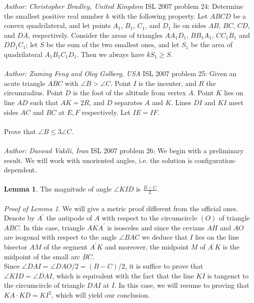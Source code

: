 \textit{Author: Christopher Bradley, United Kingdom } 
ISL 2007 problem 24:  Determine the smallest positive real number $ k$ with the following property. Let $ ABCD$ be a convex quadrilateral, and let points $ A_1$, $ B_1$, $ C_1$, and $ D_1$ lie on sides $ AB$, $ BC$, $ CD$, and $ DA$, respectively. Consider the areas of triangles $ AA_1D_1$, $ BB_1A_1$, $ CC_1B_1$ and $ DD_1C_1$; let $ S$ be the sum of the two smallest ones, and let $ S_1$ be the area of quadrilateral $ A_1B_1C_1D_1$. Then we always have $ kS_1\ge S$. \\\\
\textit{Author: Zuming Feng and Oleg Golberg, USA} 
ISL 2007 problem 25:  Given an acute triangle $ ABC$ with $ \angle B > \angle C$. Point $ I$ is the incenter, and $ R$ the circumradius. Point $ D$ is the foot of the altitude from vertex $ A$. Point $ K$ lies on line $ AD$ such that $ AK = 2R$, and $ D$ separates $ A$ and $ K$. Lines $ DI$ and $ KI$ meet sides $ AC$ and $ BC$ at $ E,F$ respectively. Let $ IE = IF$. \\\\
Prove that $ \angle B\leq 3\angle C$. \\\\
\textit{Author: Davoud Vakili, Iran} 
ISL 2007 problem 26:  We begin with a preliminary result. We will work with unoriented angles, i.e. the solution is configuration-dependent. \\\\
\textbf{Lemma 1}. The magnitude of angle $ \angle{KID}$ is $ \frac {B - C}{2}$. \\\\
\textit{Proof of Lemma 1}. We will give a metric proof different from the official ones. \\
Denote by $ A^{\prime}$ the antipode of $ A$ with respect to the circumcircle $ (O)$ of triangle $ ABC$. In this case, triangle $ AKA^{\prime}$ is isosceles and since the cevians $ AH$ and $ AO$ are isogonal with respect to the angle $ \angle{BAC}$ we deduce that $ I$ lies on the line bisector $ AM$ of the segment $ A^{\prime}K$ and moreover, the midpoint $ M$ of $ A^{\prime}K$ is the midpoint of the small arc $ BC$. \\
Since $ \angle{DAI} = \angle{DAO}/2 = (B - C)/2$, it is suffice to prove that $ \angle{KID} = \angle{DAI}$, which is equivalent with the fact that the line $ KI$ is tangenct to the circumcircle of triangle $ DAI$ at $ I$. In this case, we will resume to proving that $ KA \cdot KD = KI^2$, which will yield our conclusion. \\
